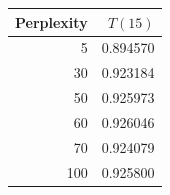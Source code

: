 \begin{tabular}{rr}\toprule
Perplexity & $T(15)$\\\midrule
5 & 0.894570\\
30 & 0.923184\\
50 & 0.925973\\
60 & 0.926046\\
70 & 0.924079\\
100 & 0.925800\\
\bottomrule\end{tabular}
